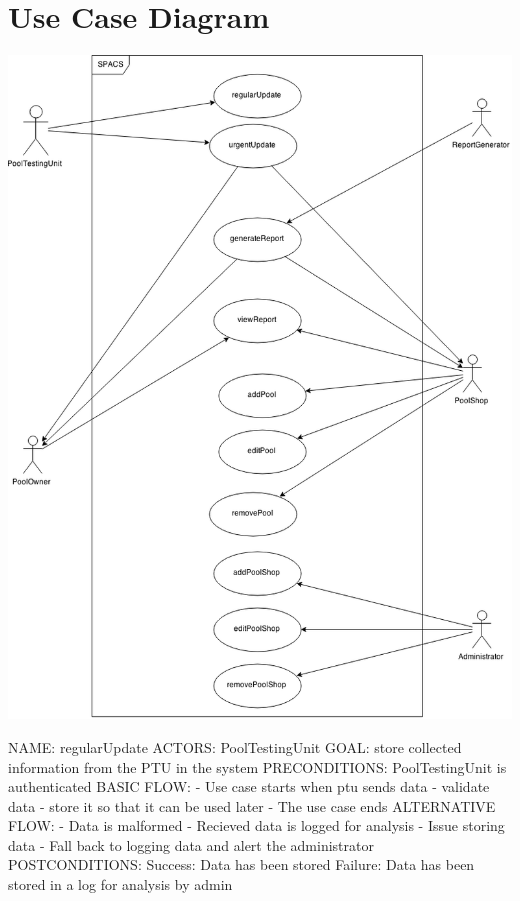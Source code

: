 \newcommand{\usecase}[7]{
	NAME: #1 \newline
	ACTORS: #2 \newline
	GOAL: #3 \newline
	PRECONDITIONS: #4 \newline
	BASIC FLOW: #5 \newline
	ALTERNATIVE FLOW: #6 \newline
	POSTCONDITIONS: #7 \newline
}

\section{Use Case Diagram}

\begin{center}
	\includegraphics[width=15cm]{images/UseCaseDiagram}
\end{center}

\usecase
{regularUpdate}
{PoolTestingUnit}
{store collected information from the PTU in the system}
{PoolTestingUnit is authenticated}
{  - Use case starts when ptu sends data
  - validate data
  - store it so that it can be used later
  - The use case ends}
{  - Data is malformed
    - Recieved data is logged for analysis
  - Issue storing data
    - Fall back to logging data and alert the administrator}
{  Success: Data has been stored
  Failure: Data has been stored in a log for analysis by admin}

